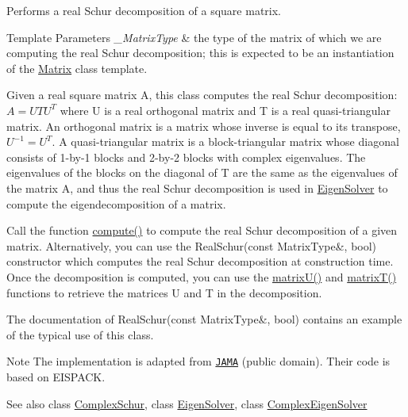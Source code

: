 Performs a real Schur decomposition of a square matrix. 


\begin{DoxyTemplParams}{Template Parameters}
{\em \+\_\+\+Matrix\+Type} & the type of the matrix of which we are computing the real Schur decomposition; this is expected to be an instantiation of the \hyperlink{group___core___module_class_eigen_1_1_matrix}{Matrix} class template.\\
\hline
\end{DoxyTemplParams}
Given a real square matrix A, this class computes the real Schur decomposition\+: $ A = U T U^T $ where U is a real orthogonal matrix and T is a real quasi-\/triangular matrix. An orthogonal matrix is a matrix whose inverse is equal to its transpose, $ U^{-1} = U^T $. A quasi-\/triangular matrix is a block-\/triangular matrix whose diagonal consists of 1-\/by-\/1 blocks and 2-\/by-\/2 blocks with complex eigenvalues. The eigenvalues of the blocks on the diagonal of T are the same as the eigenvalues of the matrix A, and thus the real Schur decomposition is used in \hyperlink{group___eigenvalues___module_class_eigen_1_1_eigen_solver}{Eigen\+Solver} to compute the eigendecomposition of a matrix.

Call the function \hyperlink{group___eigenvalues___module_a60caf9ffad11d728ea458c4dd36d0a98}{compute()} to compute the real Schur decomposition of a given matrix. Alternatively, you can use the Real\+Schur(const Matrix\+Type\&, bool) constructor which computes the real Schur decomposition at construction time. Once the decomposition is computed, you can use the \hyperlink{group___eigenvalues___module_a85622ccbecff99c8933d21f0a22b22bb}{matrix\+U()} and \hyperlink{group___eigenvalues___module_abb78996b43b8642a5f507415730445cb}{matrix\+T()} functions to retrieve the matrices U and T in the decomposition.

The documentation of Real\+Schur(const Matrix\+Type\&, bool) contains an example of the typical use of this class.

\begin{DoxyNote}{Note}
The implementation is adapted from \href{http://math.nist.gov/javanumerics/jama/}{\tt J\+A\+MA} (public domain). Their code is based on E\+I\+S\+P\+A\+CK.
\end{DoxyNote}
\begin{DoxySeeAlso}{See also}
class \hyperlink{group___eigenvalues___module_class_eigen_1_1_complex_schur}{Complex\+Schur}, class \hyperlink{group___eigenvalues___module_class_eigen_1_1_eigen_solver}{Eigen\+Solver}, class \hyperlink{group___eigenvalues___module_class_eigen_1_1_complex_eigen_solver}{Complex\+Eigen\+Solver} 
\end{DoxySeeAlso}


